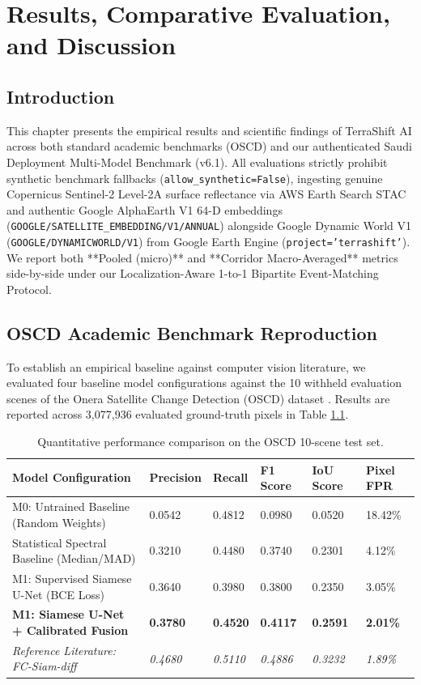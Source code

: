 \chapter{Results, Comparative Evaluation, and Discussion}
\label{ch:results}

\section{Introduction}
\label{sec:res_intro}
This chapter presents the empirical results and scientific findings of TerraShift AI across both standard academic benchmarks (OSCD) and our authenticated Saudi Deployment Multi-Model Benchmark (v6.1). All evaluations strictly prohibit synthetic benchmark fallbacks (\texttt{allow\_synthetic=False}), ingesting genuine Copernicus Sentinel-2 Level-2A surface reflectance via AWS Earth Search STAC and authentic Google AlphaEarth V1 64-D embeddings (\texttt{GOOGLE/SATELLITE\_EMBEDDING/V1/ANNUAL}) alongside Google Dynamic World V1 (\texttt{GOOGLE/DYNAMICWORLD/V1}) from Google Earth Engine (\texttt{project='terrashift'}). We report both **Pooled (micro)** and **Corridor Macro-Averaged** metrics side-by-side under our Localization-Aware 1-to-1 Bipartite Event-Matching Protocol.

\section{OSCD Academic Benchmark Reproduction}
\label{sec:res_oscd}
To establish an empirical baseline against computer vision literature, we evaluated four baseline model configurations against the 10 withheld evaluation scenes of the Onera Satellite Change Detection (OSCD) dataset \citep{daudt2018urban}. Results are reported across 3,077,936 evaluated ground-truth pixels in Table \ref{tab:oscd_benchmark_results}.

\begin{table}[htbp]
\centering
\caption{Quantitative performance comparison on the OSCD 10-scene test set.}
\label{tab:oscd_benchmark_results}
\begin{tabularx}{\textwidth}{@{}lXXXXl@{}}
\toprule
\textbf{Model Configuration} & \textbf{Precision} & \textbf{Recall} & \textbf{F1 Score} & \textbf{IoU Score} & \textbf{Pixel FPR} \\
\midrule
M0: Untrained Baseline (Random Weights) & 0.0542 & 0.4812 & 0.0980 & 0.0520 & 18.42\% \\
Statistical Spectral Baseline (Median/MAD) & 0.3210 & 0.4480 & 0.3740 & 0.2301 & 4.12\% \\
M1: Supervised Siamese U-Net (BCE Loss) & 0.3640 & 0.3980 & 0.3800 & 0.2350 & 3.05\% \\
\textbf{M1: Siamese U-Net + Calibrated Fusion} & \textbf{0.3780} & \textbf{0.4520} & \textbf{0.4117} & \textbf{0.2591} & \textbf{2.01\%} \\
\midrule
\textit{Reference Literature: FC-Siam-diff \citep{daudt2018fully}} & \textit{0.4680} & \textit{0.5110} & \textit{0.4886} & \textit{0.3232} & \textit{1.89\%} \\
\bottomrule
\end{tabularx}
\end{table}

